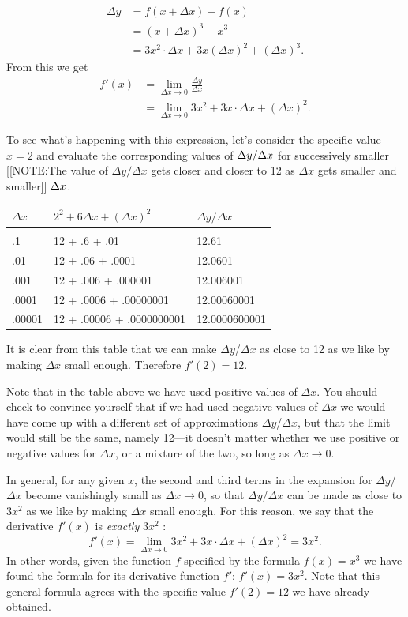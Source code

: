 \mbox{}


\begin{align*}
   \Delta y &= f(x + \Delta x) - f(x) \\
            &= (x + \Delta x)^{3} - x^{3} \\
            &= 3x^{2}\cdot\Delta x + 3x(\Delta x)^{2} + (\Delta x)^{3}. 
\end{align*}
From this we get 
\begin{align*}
f'(x) &= \lim_{\Delta x \rightarrow 0} \frac{\Delta y}{\Delta x} \\[3pt]
      &= \lim_{\Delta x \rightarrow 0} 3x^{2} + 3x\cdot\Delta x + 
      	(\Delta x)^{2}.
\end{align*}

To see what's happening with this expression, let's consider the
specific value $x=2$ and evaluate the corresponding values of $\Delta
y/ \Delta x\/$ for successively smaller
[[NOTE:The value of $\Delta y/ \Delta x$ gets closer and
  closer to 12 as $\Delta x$ gets smaller and smaller]]
$\Delta x\/$.

\begin{center}
\begin{tabular}{lll}
$\Delta x$ & $2^2 + 6\Delta x + (\Delta x)^2$ & $\Delta y/\Delta x$ \\[2pt] \hline \\ [-8pt]
.1 & 12 + .6 + .01 & 12.61 \\
.01 & 12 + .06 + .0001 & 12.0601 \\
.001 & 12 + .006 + .000001 & 12.006001 \\
.0001 & 12 + .0006 + .00000001 & 12.00060001 \\
.00001 & 12 + .00006 + .0000000001 & 12.0000600001
\end{tabular}
\end{center}
It is clear from this table that we can make $\Delta y$/$\Delta x$ as
close to 12 as we like by making $\Delta x$ small enough.  Therefore
$f'(2)=12$.

Note that in the table above we have used positive values of $\Delta
x$.  You should check to convince yourself that if we had used
negative values of $\Delta x$ we would have come up with a different
set of approximations $\Delta y$/$\Delta x$, but that the limit would
still be the same, namely 12---it doesn't matter whether we use
positive or negative values for $\Delta x$, or a mixture of the two,
so long as $\Delta x \rightarrow 0$.

In general, for any given $x$, the second and third terms in the
expansion for $\Delta y$/$\Delta x$ become vanishingly small as
$\Delta x \rightarrow 0$, so that $\Delta y$/$\Delta x$ can be made as
close to $3x^{2}$ as we like by making $\Delta x$ small enough.  For
this reason, we say that the derivative $f'(x)$ is {\em exactly\/}
$3x^{2}$ :
	\[
f'(x) = \lim_{\Delta x \rightarrow 0} 3x^2 + 3x\cdot\Delta x + 
		(\Delta x)^2 = 3x^2.
\]
In other words, given the function $f$ specified by the formula $f(x)=x^3$ we have found the formula for its derivative function $f'$: $f'(x) = 3 x^2$.  Note that this general formula agrees with the specific value $f'(2)=12$ we have already obtained.


